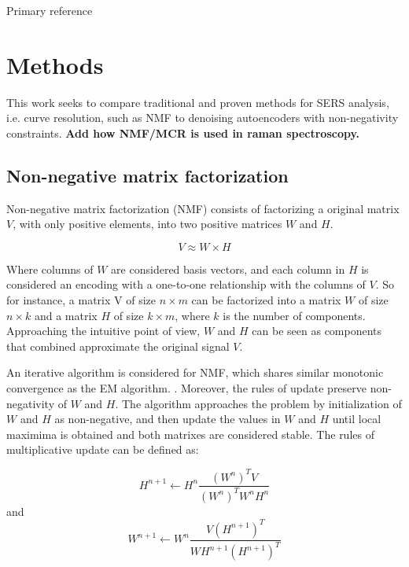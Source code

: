 \documentclass{article}
\begin{document}
Primary reference \cite{Hosseini-Asl2016}

\section{Methods}
\label{sec:methods}

This work seeks to compare traditional and proven methods for SERS analysis, i.e. curve resolution, such as NMF to denoising autoencoders with non-negativity constraints. 
\textbf{Add how NMF/MCR is used in raman spectroscopy.}

\subsection{Non-negative matrix factorization}

Non-negative matrix factorization (NMF) consists of factorizing a original matrix $V$, with only positive elements, into two positive matrices $W$ and $H$. \cite{Seung1999}


\begin{equation}
V \approx W \times H
\end{equation}

Where columns of $W$ are considered basis vectors, and each column in $H$ is considered an encoding with a one-to-one relationship with the columns of $V$. So for instance, a matrix V of size $n \times m$ can be factorized into a matrix $W$ of size $n \times k$ and a matrix $H$ of size $k \times m$, where $k$ is the number of components. Approaching the intuitive point of view, $W$ and $H$ can be seen as components that combined approximate the original signal $V$.

An iterative algorithm is considered for NMF, which shares similar monotonic convergence as the EM algorithm. \cite{Dempster1977}. Moreover, the rules of update preserve non-negativity of $W$ and $H$. The algorithm approaches the problem by initialization of $W$ and $H$ as non-negative, and then update the values in $W$ and $H$ until local maximima is obtained and both matrixes are considered stable. The rules of multiplicative update can be defined as:

\begin{equation}
H^{n+1} \leftarrow H^{n} \frac{(W^n)^TV}{(W^n)^TW^nH^n}
\end{equation}
and 
\begin{equation}
W^{n+1} \leftarrow W^{n} \frac{V(H^{n+1})^T}{WH^{n+1}(H^{n+1})^T}
\end{equation}
\end{document}
